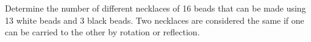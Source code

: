 \begin{problem}
Determine the number of different necklaces of 16 beads that can be made using 13 white beads and 3 black beads. Two necklaces are considered the same if one can be carried to the other by rotation or reflection.
\end{problem}